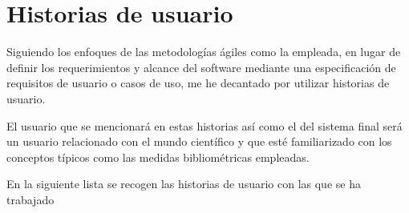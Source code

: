 \section{Historias de usuario}
Siguiendo los enfoques de las metodologías ágiles como la empleada, en lugar de definir los requerimientos y alcance del software mediante una especificación de requisitos de usuario o casos de uso, me he decantado por utilizar historias de usuario.

El usuario que se mencionará en estas historias así como el del sistema final será un usuario relacionado con el mundo científico y que esté familiarizado con los conceptos típicos como las medidas bibliométricas empleadas.

En la siguiente lista se recogen las historias de usuario con las que se ha trabajado

